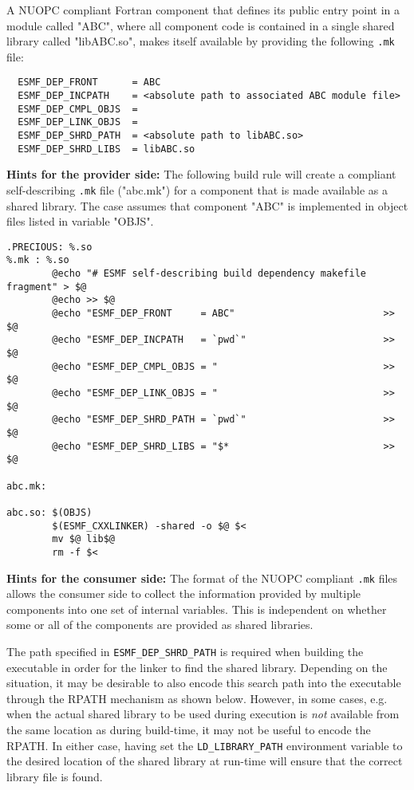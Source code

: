 A NUOPC compliant Fortran component that defines its public entry point in a module called "ABC", where all component code is contained in a single shared library called "libABC.so", makes itself available by providing the following {\tt .mk} file:

\begin{verbatim}
  ESMF_DEP_FRONT      = ABC
  ESMF_DEP_INCPATH    = <absolute path to associated ABC module file>
  ESMF_DEP_CMPL_OBJS  = 
  ESMF_DEP_LINK_OBJS  = 
  ESMF_DEP_SHRD_PATH  = <absolute path to libABC.so>
  ESMF_DEP_SHRD_LIBS  = libABC.so
\end{verbatim}

{\bf Hints for the provider side:} The following build rule will create a compliant self-describing {\tt .mk} file ("abc.mk") for a component that is made available as a shared library. The case assumes that component "ABC" is implemented in object files listed in variable "OBJS".

\begin{verbatim}
.PRECIOUS: %.so
%.mk : %.so
        @echo "# ESMF self-describing build dependency makefile fragment" > $@
        @echo >> $@
        @echo "ESMF_DEP_FRONT     = ABC"                          >> $@
        @echo "ESMF_DEP_INCPATH   = `pwd`"                        >> $@
        @echo "ESMF_DEP_CMPL_OBJS = "                             >> $@
        @echo "ESMF_DEP_LINK_OBJS = "                             >> $@
        @echo "ESMF_DEP_SHRD_PATH = `pwd`"                        >> $@
        @echo "ESMF_DEP_SHRD_LIBS = "$*                           >> $@

abc.mk:

abc.so: $(OBJS)
        $(ESMF_CXXLINKER) -shared -o $@ $<
        mv $@ lib$@
        rm -f $<
\end{verbatim}

{\bf Hints for the consumer side:} The format of the NUOPC compliant {\tt .mk} files allows the consumer side to collect the information provided by multiple components into one set of internal variables. This is independent on whether some or all of the components are provided as shared libraries.

The path specified in {\tt ESMF\_DEP\_SHRD\_PATH} is required when building the executable in order for the linker to find the shared library. Depending on the situation, it may be desirable to also encode this search path into the executable through the RPATH mechanism as shown below. However, in some cases, e.g. when the actual shared library to be used during execution is {\em not} available from the same location as during build-time, it may not be useful to encode the RPATH. In either case, having set the {\tt LD\_LIBRARY\_PATH} environment variable to the desired location of the shared library at run-time will ensure that the correct library file is found.


